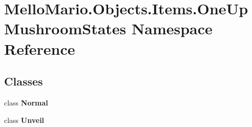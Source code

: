 \section{Mello\+Mario.\+Objects.\+Items.\+One\+Up\+Mushroom\+States Namespace Reference}
\label{namespaceMelloMario_1_1Objects_1_1Items_1_1OneUpMushroomStates}
\subsection*{Classes}
\begin{DoxyCompactItemize}
\item 
class \textbf{ Normal}
\item 
class \textbf{ Unveil}
\end{DoxyCompactItemize}

